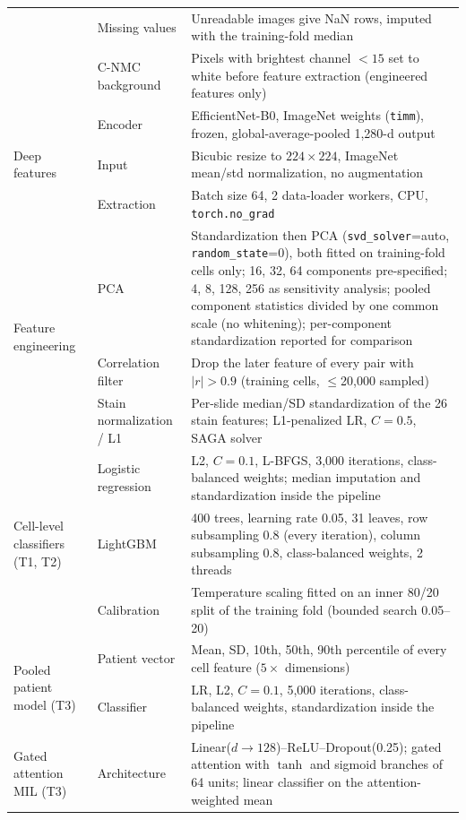{\begin{longtable}{p{3.0cm}p{5.6cm}p{8.3cm}}
 & Missing values & Unreadable images give NaN rows, imputed with the training-fold median \\
 & C-NMC background & Pixels with brightest channel $<15$ set to white before feature extraction (engineered features only) \\
\midrule
\multirow{3}{3.0cm}{Deep features} & Encoder & EfficientNet-B0, ImageNet weights (\texttt{timm}), frozen, global-average-pooled 1,280-d output \\
 & Input & Bicubic resize to $224\times224$, ImageNet mean/std normalization, no augmentation \\
 & Extraction & Batch size 64, 2 data-loader workers, CPU, \texttt{torch.no\_grad} \\
\midrule
\multirow{3}{3.0cm}{Feature engineering} & PCA & Standardization then PCA (\texttt{svd\_solver}=auto, \texttt{random\_state}=0), both fitted on training-fold cells only; 16, 32, 64 components pre-specified; 4, 8, 128, 256 as sensitivity analysis; pooled component statistics divided by one common scale (no whitening); per-component standardization reported for comparison \\
 & Correlation filter & Drop the later feature of every pair with $|r|>0.9$ (training cells, $\le$20,000 sampled) \\
 & Stain normalization / L1 & Per-slide median/SD standardization of the 26 stain features; L1-penalized LR, $C=0.5$, SAGA solver \\
\midrule
\multirow{3}{3.0cm}{Cell-level classifiers (T1, T2)} & Logistic regression & L2, $C=0.1$, L-BFGS, 3,000 iterations, class-balanced weights; median imputation and standardization inside the pipeline \\
 & LightGBM & 400 trees, learning rate 0.05, 31 leaves, row subsampling 0.8 (every iteration), column subsampling 0.8, class-balanced weights, 2 threads \\
 & Calibration & Temperature scaling fitted on an inner 80/20 split of the training fold (bounded search 0.05--20) \\
\midrule
\multirow{2}{3.0cm}{Pooled patient model (T3)} & Patient vector & Mean, SD, 10th, 50th, 90th percentile of every cell feature ($5\times$ dimensions) \\
 & Classifier & LR, L2, $C=0.1$, 5,000 iterations, class-balanced weights, standardization inside the pipeline \\
\midrule
\multirow{5}{3.0cm}{Gated attention MIL (T3)} & Architecture & Linear($d\to128$)--ReLU--Dropout(0.25); gated attention with $\tanh$ and sigmoid branches of 64 units; linear classifier on the attention-weighted mean \\

\end{longtable}}
